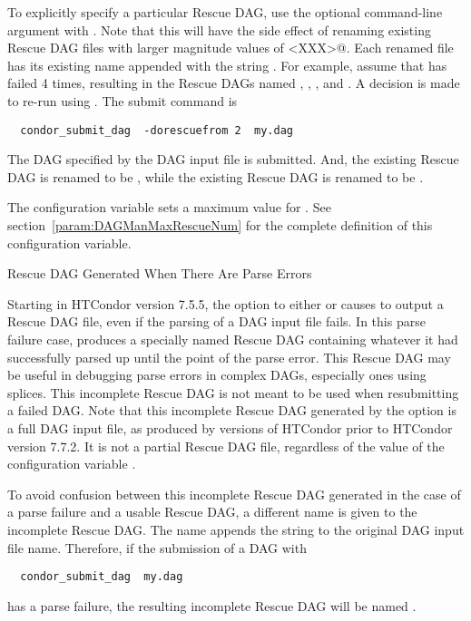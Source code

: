 To explicitly specify a particular Rescue DAG,
use the optional command-line argument 
with .
Note that this will have the side effect of renaming 
existing Rescue DAG files with larger magnitude values 
of \verb@<XXX>@.
Each renamed file has its existing name appended with
the string .
For example, assume that  has failed 4 times,
resulting in the Rescue DAGs named
,
,
,
and
.
A decision is made to re-run using .
The submit command is
\begin{verbatim}
  condor_submit_dag  -dorescuefrom 2  my.dag
\end{verbatim}
The DAG specified by the DAG input file 
is submitted.
And, the existing Rescue DAG  is
renamed to be ,
while the existing Rescue DAG  is
renamed to be .

The configuration variable 
sets a maximum value for \verb@XXX@.
See section~\ref{param:DAGManMaxRescueNum} for the complete definition
of this configuration variable.


\label{dagman:rescue_parse_error}
\begin{description}
\item[Rescue DAG Generated When There Are Parse Errors]
\end{description}

Starting in HTCondor version 7.5.5,
the  option to either  or 
causes  to output a Rescue DAG file, 
even if the parsing of a DAG input file fails.
In this parse failure case,  produces a specially 
named Rescue DAG containing whatever it had successfully parsed up
until the point of the parse error.
This Rescue DAG may be useful in debugging parse errors in complex DAGs,
especially ones using splices.
This incomplete Rescue DAG is not meant to be used when resubmitting
a failed DAG.  
Note that this incomplete Rescue DAG generated by the 
option is a full DAG input file, 
as produced by versions of HTCondor prior to HTCondor version 7.7.2.
It is not a partial Rescue DAG file,
regardless of the value of the configuration variable
.

To avoid confusion between this incomplete Rescue DAG
generated in the case of a parse failure and a usable Rescue DAG,
a different name is given to the incomplete Rescue DAG.
The name appends the string  to the original
DAG input file name.
Therefore, if the submission of a DAG with
\begin{verbatim}
  condor_submit_dag  my.dag
\end{verbatim}
has a parse failure, the resulting incomplete Rescue DAG will be
named .

